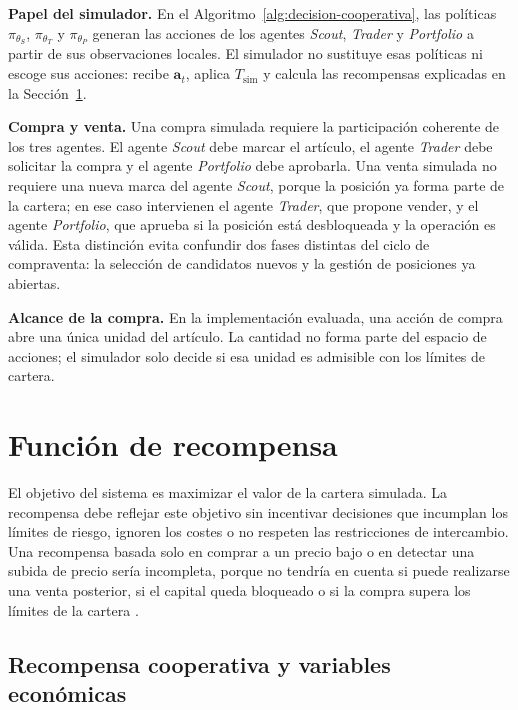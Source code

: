 \textbf{Papel del simulador.} En el Algoritmo~\ref{alg:decision-cooperativa}, las políticas $\pi_{\theta_S}$, $\pi_{\theta_T}$ y $\pi_{\theta_P}$ generan las acciones de los agentes \textit{Scout}, \textit{Trader} y \textit{Portfolio} a partir de sus observaciones locales. El simulador no sustituye esas políticas ni escoge sus acciones: recibe $\mathbf{a}_t$, aplica $T_{\mathrm{sim}}$ y calcula las recompensas explicadas en la Sección~\ref{sec:funcion-recompensa}.

\textbf{Compra y venta.} Una compra simulada requiere la participación coherente de los tres agentes. El agente \textit{Scout} debe marcar el artículo, el agente \textit{Trader} debe solicitar la compra y el agente \textit{Portfolio} debe aprobarla. Una venta simulada no requiere una nueva marca del agente \textit{Scout}, porque la posición ya forma parte de la cartera; en ese caso intervienen el agente \textit{Trader}, que propone vender, y el agente \textit{Portfolio}, que aprueba si la posición está desbloqueada y la operación es válida. Esta distinción evita confundir dos fases distintas del ciclo de compraventa: la selección de candidatos nuevos y la gestión de posiciones ya abiertas.

\textbf{Alcance de la compra.} En la implementación evaluada, una acción de compra abre una única unidad del artículo. La cantidad no forma parte del espacio de acciones; el simulador solo decide si esa unidad es admisible con los límites de cartera.

\section{Función de recompensa}
\label{sec:funcion-recompensa}

El objetivo del sistema es maximizar el valor de la cartera simulada. La recompensa debe reflejar este objetivo sin incentivar decisiones que incumplan los límites de riesgo, ignoren los costes o no respeten las restricciones de intercambio. Una recompensa basada solo en comprar a un precio bajo o en detectar una subida de precio sería incompleta, porque no tendría en cuenta si puede realizarse una venta posterior, si el capital queda bloqueado o si la compra supera los límites de la cartera \cite{sutton2018reinforcement,markowitz1952portfolio,liu2021finrl}.

\subsection{Recompensa cooperativa y variables económicas}
\label{sec:recompensa-cooperativa}

